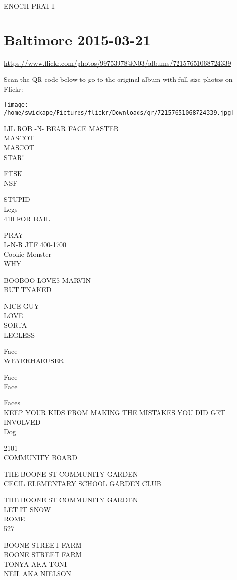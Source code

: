 \documentclass[10pt,letterpaper]{article}
\begin{document}
ENOCH PRATT


\section*{Baltimore 2015-03-21}

\url{https://www.flickr.com/photos/99753978@N03/albums/72157651068724339}

Scan the QR code below to go to the original album with full-size photos on Flickr:

\texttt{[image: /home/swickape/Pictures/flickr/Downloads/qr/72157651068724339.jpg]}


LIL ROB {-}N{-} BEAR FACE MASTER\\
MASCOT\\
MASCOT\\
STAR!

FTSK\\
NSF

STUPID\\
Legs\\
410{-}FOR{-}BAIL

PRAY\\
L{-}N{-}B JTF 400{-}1700\\
Cookie Monster\\
WHY

BOOBOO LOVES MARVIN\\
BUT TNAKED

NICE GUY\\
LOVE\\
SORTA\\
LEGLESS

Face\\
WEYERHAEUSER

Face\\
Face

Faces\\
KEEP YOUR KIDS FROM MAKING THE MISTAKES YOU DID GET INVOLVED\\
Dog

2101\\
COMMUNITY BOARD

THE BOONE ST COMMUNITY GARDEN\\
CECIL ELEMENTARY SCHOOL GARDEN CLUB

THE BOONE ST COMMUNITY GARDEN\\
LET IT SNOW\\
ROME\\
527

BOONE STREET FARM\\
BOONE STREET FARM\\
TONYA AKA TONI\\
NEIL AKA NIELSON
\end{document}
